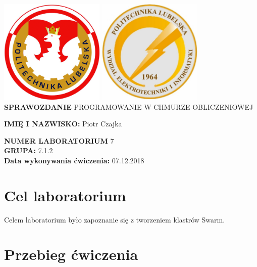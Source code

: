 \documentclass[12pt]{article}
\begin{document}
    \centering
    \includegraphics[width=5cm, height=5cm,]{herbPL.jpg}
    \hspace{2cm}
    \includegraphics[width=5cm, height=5cm]{herbWEII.jpg}\\
    \vspace{2cm}
    {\Huge \textbf{SPRAWOZDANIE}}
    \vspace{2cm}
    \newline
    {\large PROGRAMOWANIE W CHMURZE OBLICZENIOWEJ}
    \vfill

    \raggedright{}

    \textbf{IMIĘ I NAZWISKO:} Piotr Czajka

    \textbf{NUMER LABORATORIUM} 7\\
    \textbf{GRUPA:} 7.1.2\\
    \textbf{Data wykonywania ćwiczenia:} 07.12.2018\\

    \newpage

    \tableofcontents{}

    \newpage

    \section{Cel laboratorium}
    Celem laboratorium było zapoznanie się z tworzeniem klastrów Swarm.

    \section{Przebieg ćwiczenia}
\end{document}
